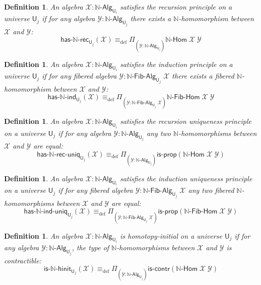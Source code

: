\documentclass[reqno,10pt,a4paper,oneside]{amsart}
\numberwithin{equation}{section}
\theoremstyle{mythm}
\theoremstyle{mydef}
\newtheorem{definition}[theorem]{Definition}
\theoremstyle{myrmk}
\newcommand{\deq}{\equiv}
\newcommand{\defeq}{\deq_{\mathrm{def}}}
\newcommand{\iscontr}{\mathsf{is}\text{-}\mathsf{contr}}
\newcommand{\isprop}{\mathsf{is}\text{-}\mathsf{prop}}
\newcommand{\prd}[1]{\Pi_{#1}}
\newcommand{\nat}{\ensuremath{\mathbb{N}}}
\newcommand{\UU}{\mathsf{U}}
\newcommand{\NatAlg}{\nat\text{-}\mathsf{Alg}}
\newcommand{\NatHom}{\nat\text{-}\mathsf{Hom}}
\newcommand{\HasNatRec}{\mathsf{has}\text{-}\nat\text{-}\mathsf{rec}}
\newcommand{\HasNatInd}{\mathsf{has}\text{-}\nat\text{-}\mathsf{ind}}
\newcommand{\HasNatRecUniq}{\mathsf{has}\text{-}\nat\text{-}\mathsf{rec}\text{-}\mathsf{uniq}}
\newcommand{\HasNatIndUniq}{\mathsf{has}\text{-}\nat\text{-}\mathsf{ind}\text{-}\mathsf{uniq}}
\newcommand{\NatFibAlg}{\nat\text{-}\mathsf{Fib}\text{-}\mathsf{Alg}}
\newcommand{\NatFibHom}{\nat\text{-}\mathsf{Fib}\text{-}\mathsf{Hom}}
\newcommand{\IsNatHInit}{\mathsf{is}\text{-}\nat\text{-}\mathsf{hinit}}
\newcommand{\X}{\mathcal{X}}
\newcommand{\Y}{\mathcal{Y}}
\begin{document}
\begin{definition}\label{def:NatRec}
An algebra $\X : \NatAlg_{\UU_i}$ \emph{satisfies the recursion principle} on a universe $\UU_j$ if for any 
algebra $\Y : \NatAlg_{\UU_j}$ there exists a $\nat$-homomorphism between $\X$ and $\Y$:
\[\HasNatRec_{\UU_j}(\X) \defeq \prd{(\Y:\NatAlg_{\UU_j})} \NatHom \; \X \; \Y\] 
\end{definition}

\begin{definition}\label{def:NatInd}
An algebra $\mathcal{X} : \NatAlg_{\UU_i}$ \emph{satisfies the induction principle} on a universe $\UU_j$ if for any 
fibered algebra $\Y : \NatFibAlg_{\UU_j} \; \X$ there exists a fibered $\nat$-homomorphism between $\X$ and $\Y$:
\[\HasNatInd_{\UU_j}(\X) \defeq \prd{(\Y:\NatFibAlg_{\UU_j} \; \X)} \NatFibHom \; \X \; \Y\] 
\end{definition}

\begin{definition}\label{def:NatRecUniq}
An algebra $\X : \NatAlg_{\UU_i}$ satisfies the \emph{recursion uniqueness principle} on a universe $\UU_j$ if for any algebra $\Y : \NatAlg_{\UU_j}$ any two $\nat$-homomorphisms between $\X$ and $\Y$ are equal:
\[ \HasNatRecUniq_{\UU_j}(\X) \defeq \prd{(\Y:\NatAlg_{\UU_j})} \isprop(\NatHom \; \X \; \Y)\]
\end{definition}

\begin{definition}\label{def:NatIndUniq}
An algebra $\X : \NatAlg_{\UU_i}$ satisfies the \emph{induction uniqueness principle} on a universe $\UU_j$ if for any fibered algebra $\Y : \NatFibAlg_{\UU_j}\;\X$ any two fibered $\nat$-homomorphisms between $\X$ and $\Y$ are equal:
\[ \HasNatIndUniq_{\UU_j}(\X) \defeq \prd{(\Y:\NatFibAlg_{\UU_j} \; \X)} \isprop(\NatFibHom \; \X \; \Y)\]
\end{definition}

\begin{definition}\label{def:NatInit}
An algebra $\X : \NatAlg_{\UU_i}$ is \emph{homotopy-initial} on a universe $\UU_j$ if for any algebra $\Y : \NatAlg_{\UU_j}$, the type of $\nat$-homomorphisms between $\X$ and $\Y$ is contractible:
\[ \IsNatHInit_{\UU_j}(\X) \defeq \prd{(\Y:\NatAlg_{\UU_j})} \iscontr(\NatHom \; \X \; \Y) \]  
\end{definition}
\end{document}
